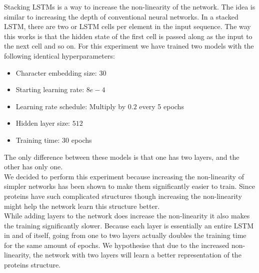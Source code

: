Stacking LSTMs is a way to increase the non-linearity of the network. The idea is similar to increasing the depth of conventional neural networks. In a stacked LSTM, there are two or LSTM cells per element in the input sequence. The way this works is that the hidden state of the first cell is passed along as the input to the next cell and so on. For this experiment we have trained two models with the following identical hyperparameters:
\begin{itemize}
	\item Character embedding size: 30
	\item Starting learning rate: $8e-4$
	\item Learning rate schedule: Multiply by $0.2$ every 5 epochs
	\item Hidden layer size: $512$
	\item Training time: 30 epochs
\end{itemize}
The only difference between these models is that one has two layers, and the other has only one.\\

\noindent
We decided to perform this experiment because increasing the non-linearity of simpler networks has been shown to make them significantly easier to train. Since proteins have such complicated structures though increasing the non-linearity might help the network learn this structure better.\\

\noindent
While adding layers to the network does increase the non-linearity it also makes the training significantly slower. Because each layer is essentially an entire LSTM in and of itself, going from one to two layers actually doubles the training time for the same amount of epochs. We hypothesise that due to the increased non-linearity, the network with two layers will learn a better representation of the proteins structure.